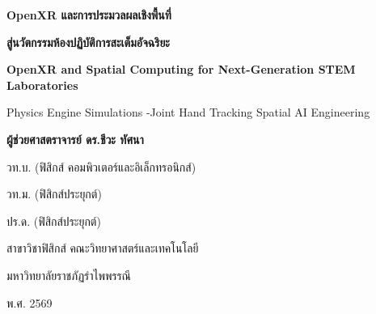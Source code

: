 \thispagestyle{empty}
\begin{center}
    \vspace*{1.5cm}
    
    {\Huge\bfseries\color{darkNavy} OpenXR และการประมวลผลเชิงพื้นที่\par}
    \vspace{0.4cm}
    {\LARGE\bfseries\color{spatialBlue} สู่นวัตกรรมห้องปฏิบัติการสะเต็มอัจฉริยะ\par}
    
    \vspace{0.6cm}
    {\large\bfseries\color{openxrTeal} OpenXR and Spatial Computing for Next-Generation STEM Laboratories\par}
    \vspace{0.2cm}
    {\normalsize\color{slateGrey} Physics Engine Simulations \quad \textbullet {}-Joint Hand Tracking \quad \textbullet \quad Spatial AI Engineering\par}

    
    \vspace{2.5cm}
    
    {\Large\bfseries ผู้ช่วยศาสตราจารย์ ดร.ชีวะ ทัศนา\par}
    \vspace{0.3cm}
    {\large วท.บ. (ฟิสิกส์ คอมพิวเตอร์และอิเล็กทรอนิกส์)\par}
    {\large วท.ม. (ฟิสิกส์ประยุกต์)\par}
    {\large ปร.ด. (ฟิสิกส์ประยุกต์)\par}
    
    \vfill
    
    {\large สาขาวิชาฟิสิกส์ คณะวิทยาศาสตร์และเทคโนโลยี\par}
    {\large มหาวิทยาลัยราชภัฏรำไพพรรณี\par}
    \vspace{0.4cm}
    {\large พ.ศ. 2569\par}
    \vspace*{1.0cm}
\end{center}
\clearpage
